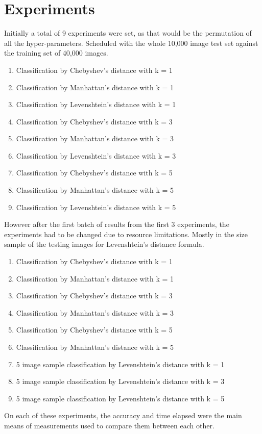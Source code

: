 \documentclass[conference,compsoc]{IEEEtran}
\begin{document}
\section{Experiments}
Initially a total of 9 experiments were set, as that would be the permutation of all the hyper-parameters. Scheduled with the whole 10,000 image test set against the training set of 40,000 images. 
\begin{enumerate}
  \item Classification by Chebyshev's distance with k = 1
  \item Classification by Manhattan's distance with k = 1
  \item Classification by Levenshtein's distance with k = 1
  \item Classification by Chebyshev's distance with k = 3
  \item Classification by Manhattan's distance with k = 3
  \item Classification by Levenshtein's distance with k = 3
  \item Classification by Chebyshev's distance with k = 5
  \item Classification by Manhattan's distance with k = 5
  \item Classification by Levenshtein's distance with k = 5
\end{enumerate}
However after the first batch of results from the first 3 experiments, the experiments had to be changed due to resource limitations. Mostly in the size sample of the testing images for Levenshtein's distance formula.
\begin{enumerate}
  \item Classification by Chebyshev's distance with k = 1
  \item Classification by Manhattan's distance with k = 1
  \item Classification by Chebyshev's distance with k = 3
  \item Classification by Manhattan's distance with k = 3
  \item Classification by Chebyshev's distance with k = 5
  \item Classification by Manhattan's distance with k = 5
  \item 5 image sample classification by Levenshtein's distance with k = 1
  \item 5 image sample classification by Levenshtein's distance with k = 3
  \item 5 image sample classification by Levenshtein's distance with k = 5
\end{enumerate}
On each of these experiments, the accuracy and time elapsed were the main means of measurements used to compare them between each other.
\end{document}

